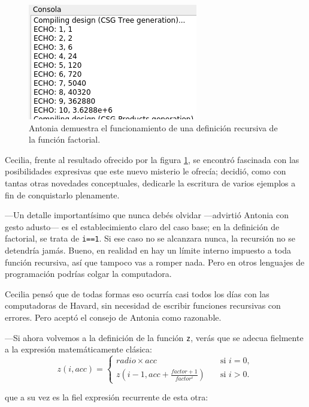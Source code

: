 \begin{figure}[ht]
  \centering
  \includegraphics[width=.55\textwidth]{imagenes/consola-echo-factorial}
  \caption{Antonia demuestra el funcionamiento de una definición
    recursiva de la función factorial.}
  \label{fig:consola-echo-factorial}
\end{figure}
  
Cecilia, frente al resultado ofrecido por la figura
\ref{fig:consola-echo-factorial}, se encontró fascinada con las
posibilidades expresivas que este nuevo misterio le ofrecía; decidió,
como con tantas otras novedades conceptuales, dedicarle la escritura
de varios ejemplos a fin de conquistarlo plenamente.

---Un detalle importantísimo que nunca debés olvidar ---ad\-vir\-tió
Antonia con gesto adusto--- es el establecimiento claro del caso base;
en la definición de factorial, se trata de \lstinline!i==1!. Si ese
caso no se alcanzara nunca, la recursión no se detendría jamás. Bueno,
en realidad en \openscad{} hay un límite interno impuesto a toda
función recursiva, así que tampoco vas a romper nada. Pero en otros
lenguajes de programación podrías colgar la computadora.

Cecilia pensó que de todas formas eso ocurría casi todos los días con
las computadoras de Havard, sin necesidad de escribir funciones
recursivas con errores. Pero aceptó el consejo de Antonia como
razonable.

---Si ahora volvemos a la definición de la función \lstinline!z!,
verás que se adecua fielmente a la expresión matemáticamente clásica:
\begin{equation*}
  z(i,acc) = 
  \begin{cases}
      radio\times acc &\quad \text{si } i=0,\\
      z\left(i-1,acc+\frac{factor+1}{factor^i}\right)&\quad \text{si } i>0.
  \end{cases}
\end{equation*}

\guillemotright que a su vez es la fiel expresión recurrente de esta otra:

